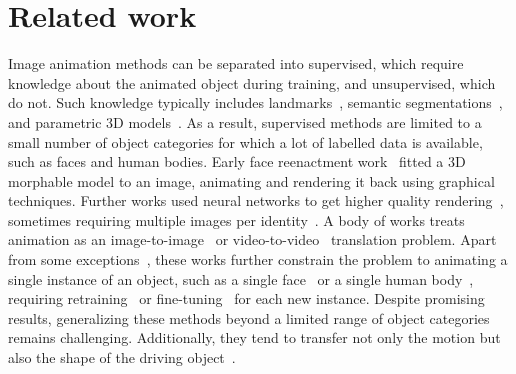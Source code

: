 \documentclass[final]{cvpr}
\begin{document}
\section{Related work}
\vspace{-0.2cm}
Image animation methods can be separated into supervised, which require knowledge about the animated object during training, and unsupervised, which do not. Such knowledge typically includes landmarks~\cite{cao2014displaced, zakharov2019few, Qian_2019_ICCV,ha2019marionette}, semantic segmentations~\cite{Nirkin_2019_ICCV}, and parametric 3D models~\cite{geng20193d, thies2016face2face, deng2020disentangled, nagano2018pagan,liu2019liquid}. As a result, supervised methods are limited to a small number of object categories for which a lot of labelled data is available, such as faces and human bodies.
Early face reenactment work~\cite{thies2016face2face} fitted a 3D morphable model to an image, animating and rendering it back using graphical techniques. Further works used neural networks to get higher quality rendering~\cite{kim2018deep, wang2018every}, sometimes requiring multiple images per identity~\cite{geng20193d, pumarola2018ganimation}. A body of works treats animation as an image-to-image~\cite{siarohin2018deformable} or video-to-video~\cite{wang2018video, chan2019everybody,ren2020human} translation problem. Apart from some exceptions~\cite{wang2019few}, these works further constrain the problem to animating a single instance of an object, such as a single face~\cite{kim2018deep,bansal2018recycle} or a single human body~\cite{chan2019everybody, ren2020human, wang2018video}, requiring retraining~\cite{bansal2018recycle,chan2019everybody,ren2020human} or fine-tuning~\cite{zakharov2019few} for each new instance. Despite promising results, generalizing these methods beyond a limited range of object categories remains challenging. Additionally, they tend to transfer not only the motion but also the shape of the driving object~\cite{kim2018deep, zakharov2019few}.
\end{document}
